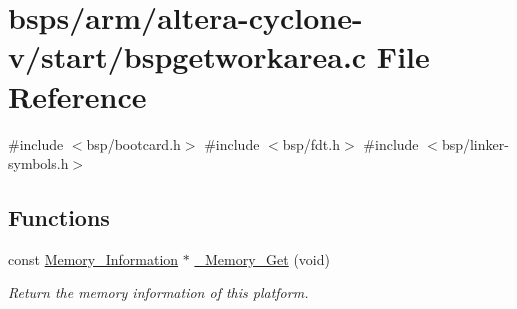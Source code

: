 \hypertarget{arm_2altera-cyclone-v_2start_2bspgetworkarea_8c}{}\section{bsps/arm/altera-\/cyclone-\/v/start/bspgetworkarea.c File Reference}
\label{arm_2altera-cyclone-v_2start_2bspgetworkarea_8c}
{\ttfamily \#include $<$bsp/bootcard.\+h$>$}\newline
{\ttfamily \#include $<$bsp/fdt.\+h$>$}\newline
{\ttfamily \#include $<$bsp/linker-\/symbols.\+h$>$}\newline
\subsection*{Functions}
\begin{DoxyCompactItemize}
\item 
const \mbox{\hyperlink{structMemory__Information}{Memory\+\_\+\+Information}} $\ast$ \mbox{\hyperlink{group__RTEMSScoreMemory_gaec9f82588542ae89940517c48f0208f6}{\+\_\+\+Memory\+\_\+\+Get}} (void)
\begin{DoxyCompactList}\small\item\em Return the memory information of this platform. \end{DoxyCompactList}\end{DoxyCompactItemize}
